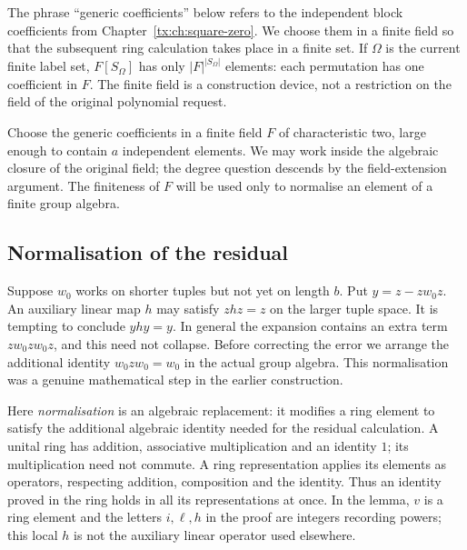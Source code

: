 \documentclass[11pt,a4paper,oneside,openany]{book}
\theoremstyle{definition}\newtheorem{definition}[theorem]{Definition}
\theoremstyle{remark}\newtheorem{remark}[theorem]{Remark}
\numberwithin{equation}{chapter}
\begin{document}
The phrase ``generic coefficients'' below refers to the independent
block coefficients from Chapter~\ref{tx:ch:square-zero}. We choose
them in a finite field so that the subsequent ring calculation takes
place in a finite set. If $\Omega$ is the current finite label set,
$F[S_\Omega]$ has only $|F|^{|S_\Omega|}$ elements: each permutation
has one coefficient in $F$. The finite field is a construction device,
not a restriction on the field of the original polynomial request.

Choose the generic coefficients in a finite field $F$ of characteristic two, large enough to contain $a$ independent elements. We may work inside the algebraic closure of the original field; the degree question descends by the field-extension argument. The finiteness of $F$ will be used only to normalise an element of a finite group algebra.

\subsection{Normalisation of the residual}
Suppose $w_0$ works on shorter tuples but not yet on length $b$. Put $y=z-zw_0z$. An auxiliary linear map $h$ may satisfy $zhz=z$ on the larger tuple space. It is tempting to conclude $yhy=y$. In general the expansion contains an extra term $zw_0zw_0z$, and this need not collapse. Before correcting the error we arrange the additional identity $w_0zw_0=w_0$ in the actual group algebra. This normalisation was a genuine mathematical step in the earlier construction.

Here \emph{normalisation} is an algebraic replacement: it modifies
a ring element to satisfy the
additional algebraic identity needed for the residual calculation.
A unital ring has addition, associative multiplication and an identity
$1$; its multiplication need not commute. A ring representation applies
its elements as operators, respecting addition, composition and the
identity. Thus an identity proved in the ring holds in all its
representations at once. In the lemma, $v$ is a ring element and
the letters $i,\ell,h$ in the proof are integers recording powers;
this local $h$ is not the auxiliary linear operator used elsewhere.
\end{document}

